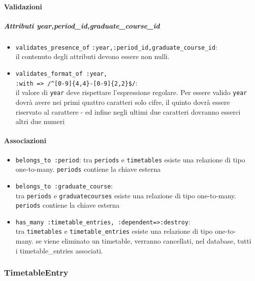 \documentclass[11pt,a4paper]{article}
\begin{document}
\paragraph{Validazioni}
\subparagraph{Attributi year,period\_id,graduate\_course\_id}
\begin{itemize}
 \item \verb|validates_presence_of|
	\verb|:year,:period_id,graduate_course_id|:\\
 il contenuto degli attributi devono essere non nulli.
 \item \verb|validates_format_of :year,|\\
\verb|:with => /^[0-9]{4,4}-[0-9]{2,2}$/|:\\ 
il valore di \verb|year| deve rispettare l'espressione regolare. Per essere valido \verb|year| dovrà avere nei primi quattro caratteri solo cifre, il quinto dovrà essere riservato al carattere - ed infine negli ultimi due caratteri dovranno esserci altri due numeri
 \end{itemize}
\paragraph{Associazioni}
\begin{itemize}
 \item \verb|belongs_to :period|: tra \verb|periods| e \verb|timetables| esiste una relazione di tipo one-to-many. \verb|periods| contiene la chiave esterna
 \item \verb|belongs_to :graduate_course|:\\ tra \verb|periods| e \verb|graduatecourses| esiste una relazione di tipo one-to-many. \verb|periods| contiene la chiave esterna
 \item \verb|has_many :timetable_entries, :dependent=>:destroy|:\\ tra \verb|timetables| e \verb|timetable_entries| esiste una relazione di tipo one-to-many. se viene eliminato un timetable, verranno cancellati, nel database, tutti i timetable\_entries associati.
\end{itemize}
\subsubsection{TimetableEntry}
\end{document}
